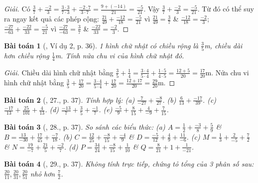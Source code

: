 \documentclass{article}
\newtheorem{baitoan}{Bài toán}
\begin{document}
\begin{proof}[Giải]
	Có $\frac{3}{7} + \frac{-2}{3} = \frac{3\cdot3}{7\cdot3} + \frac{-2\cdot7}{3\cdot7} = \frac{9 + (-14)}{21} = \frac{-5}{21}$. Vậy $\frac{3}{7} + \frac{-2}{3} = \frac{-5}{21}$. Từ đó có thể suy ra ngay kết quả các phép cộng: $\frac{21}{49} + \frac{-12}{18} = \frac{-5}{21}$ vì $\frac{21}{49} = \frac{3}{7}$ \& $\frac{-12}{18} = \frac{-2}{3}$; $\frac{-27}{-63} + \frac{-22}{33} = \frac{-5}{21}$ vì $\frac{-27}{-63} = \frac{3}{7}$ \& $\frac{-22}{33} = \frac{-2}{3}$.
\end{proof}

\begin{baitoan}[\cite{SBT_Toan_6_Canh_Dieu_tap_2}, Ví dụ 2, p. 36]
	1 hình chữ nhật có chiều rộng là $\frac{3}{5}$\emph{m}, chiều dài hơn chiều rộng $\frac{1}{4}$\emph{m}. Tính nửa chu vi của hình chữ nhật đó.
\end{baitoan}

\begin{proof}[Giải]
	Chiều dài hình chữ nhật bằng $\frac{3}{5} + \frac{1}{4} = \frac{3\cdot4}{5\cdot4} + \frac{1\cdot5}{4\cdot5} = \frac{12 + 5}{20} = \frac{17}{20}$m. Nửa chu vi hình chữ nhật bằng $\frac{3}{5} + \frac{17}{20} = \frac{3\cdot4}{5\cdot4} + \frac{17}{20} = \frac{12 + 17}{20} = \frac{29}{20}$m.
\end{proof}

\begin{baitoan}[\cite{SBT_Toan_6_Canh_Dieu_tap_2}, 27., p. 37]
	Tính hợp lý: (a) $\frac{7}{-27} + \frac{-8}{27}$. (b) $\frac{6}{13} + \frac{-17}{39}$. (c) $\frac{-17}{13} + \frac{25}{101} + \frac{4}{13}$. (d) $\frac{-13}{7} + \frac{3}{5} + \frac{-1}{7}$. (e) $\frac{-5}{9} + \frac{8}{15} + \frac{4}{-9} + \frac{7}{15}$.
\end{baitoan}

\begin{baitoan}[\cite{SBT_Toan_6_Canh_Dieu_tap_2}, 28., p. 37]
	So sánh các biểu thức: (a) $A = \frac{1}{2} + \frac{-3}{8} + \frac{5}{9}$ \& $B = \frac{13}{-30} + \frac{17}{45} + \frac{-7}{18}$. (b) $C = \frac{12}{25} + \frac{-8}{15} + \frac{-4}{9}$ \& $D = \frac{-5}{12} + \frac{4}{9} + \frac{11}{-6}$. (c) $M = \frac{1}{3} + \frac{2}{-5} + \frac{7}{2}$ \& $N = \frac{19}{-7} + \frac{21}{5} + \frac{-2}{7}$. (d) $P = \frac{34}{24} + \frac{-8}{15} + \frac{1}{10}$ \& $Q = \frac{8}{21} + 1 + \frac{1}{-21}$.
\end{baitoan}

\begin{baitoan}[\cite{SBT_Toan_6_Canh_Dieu_tap_2}, 29., p. 37]
	Không tính trực tiếp, chứng tỏ tổng của 3 phân số sau: $\frac{20}{11},\frac{20}{31},\frac{20}{51}$ nhỏ hơn $\frac{7}{2}$.
\end{baitoan}
\end{document}
